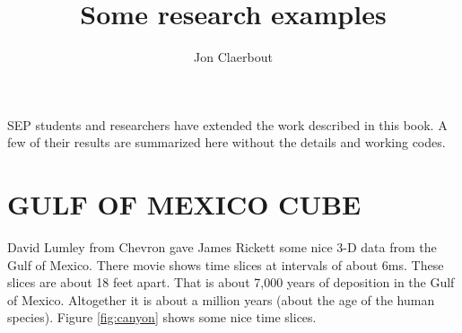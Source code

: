 \title{Some research examples}
\author{Jon Claerbout}
\maketitle
\label{paper:rez}
SEP students and researchers
have extended the work described in this book.
A few of their results
are summarized here without the details
and working codes.



\section{GULF OF MEXICO CUBE}
David Lumley from Chevron gave James Rickett
some nice 3-D data from the Gulf of Mexico.
There movie shows time slices at intervals of about 6ms.
These slices are about 18 feet apart.
That is about 7,000 years of deposition in the Gulf of Mexico.
Altogether it is about a million years
(about the age of the human species).
Figure \ref{fig:canyon} shows some nice time slices.

\clearpage

